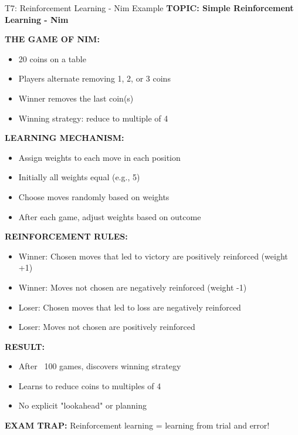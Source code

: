 \documentclass[8pt]{beamer}
\begin{document}
	\begin{frame}{T7: Reinforcement Learning - Nim Example}
		\fontsize{6.5}{7.5}\selectfont
		\textbf{TOPIC: Simple Reinforcement Learning - Nim}
		
		\vspace{0.1cm}
		\textbf{THE GAME OF NIM:}
		\begin{itemize}
			\item 20 coins on a table
			\item Players alternate removing 1, 2, or 3 coins
			\item Winner removes the last coin(s)
			\item Winning strategy: reduce to multiple of 4
		\end{itemize}
		
		\vspace{0.1cm}
		\textbf{LEARNING MECHANISM:}
		\begin{itemize}
			\item Assign weights to each move in each position
			\item Initially all weights equal (e.g., 5)
			\item Choose moves randomly based on weights
			\item After each game, adjust weights based on outcome
		\end{itemize}
		
		\vspace{0.1cm}
		\textbf{REINFORCEMENT RULES:}
		\begin{itemize}
			\item \textcolor{myblue}{Winner:} Chosen moves that led to victory are positively reinforced (weight +1)
			\item \textcolor{myblue}{Winner:} Moves not chosen are negatively reinforced (weight -1)
			\item \textcolor{myblue}{Loser:} Chosen moves that led to loss are negatively reinforced
			\item \textcolor{myblue}{Loser:} Moves not chosen are positively reinforced
		\end{itemize}
		
		\vspace{0.1cm}
		\textbf{RESULT:}
		\begin{itemize}
			\item After ~100 games, discovers winning strategy
			\item Learns to reduce coins to multiples of 4
			\item No explicit "lookahead" or planning
		\end{itemize}
		
		\textcolor{myred}{\textbf{EXAM TRAP:}} Reinforcement learning = \textcolor{myblue}{learning from trial and error}!
	\end{frame}
	
\end{document}
